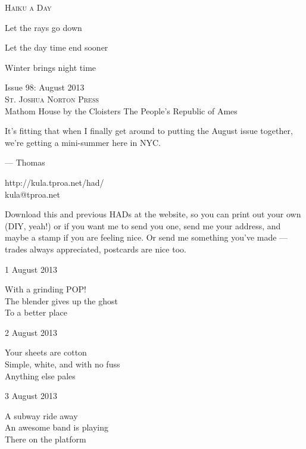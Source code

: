 \documentclass[12pt]{article}
\begin{document}
\begin{center}
{\fontsize{36}{48}\selectfont \textsc{Haiku a Day }}
\end{center}

\vspace*{3.5cm}

{\fontsize{20}{40}\selectfont 

Let the rays go down

Let the day time end sooner

Winter brings night time

}

\vspace*{5.0cm}
\begin{center}
{\large{Issue 98: August 2013}} \\[5mm]
{\fontsize{8}{8}\selectfont  \textsc{ St. Joshua Norton Press }} \\[1mm]
{\fontsize{6}{6}\selectfont Mathom House by the Cloisters \textbar The People's Republic of Ames }
\end{center}


\newpage

It's fitting that when I finally get around to putting the August issue
together, we're getting a mini-summer here in NYC.

--- Thomas

http://kula.tproa.net/had/ \\
kula@tproa.net

Download this and previous HADs at the website, so you can
print out your own (DIY, yeah!) or if you want me to send
you one, send me your address, and maybe a stamp if you
are feeling nice. Or send me something you've made ---
trades always appreciated, postcards are nice too.

\vfill

1 August 2013

With a grinding POP! \\
The blender gives up the ghost \\
To a better place

2 August 2013

Your sheets are cotton \\
Simple, white, and with no fuss \\
Anything else pales

3 August 2013

A subway ride away \\
An awesome band is playing \\
There on the platform
\end{document}

